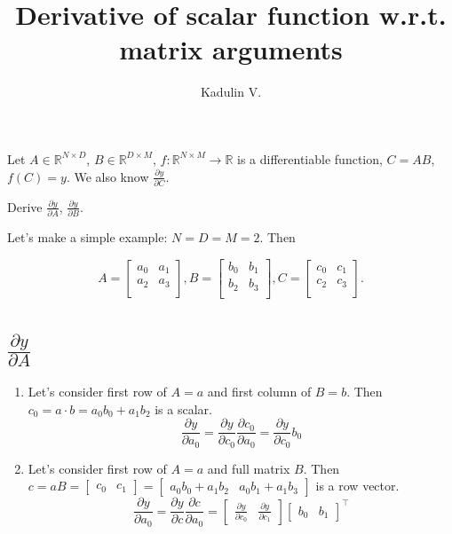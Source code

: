 \documentclass[12pt]{article}
\begin{document}
\title{Derivative of scalar function w.r.t. matrix arguments}
\author{Kadulin V.}
\maketitle

Let $A \in \mathbb{R}^{N \times D}$, $B \in \mathbb{R}^{D \times M}$, 
$f: \mathbb{R}^{N \times M} \rightarrow \mathbb{R}$ is a differentiable function, $C = AB$, $f(C) = y$. We also know $\frac{\partial y}{\partial C}$. 

Derive $\frac{\partial y}{\partial A}$, $\frac{\partial y}{\partial B}$.

Let's make a simple example: $N = D = M = 2$. Then

\[
	A = 
	\begin{bmatrix} 
		a_0 & a_1 \\
		a_2 & a_3 \\
	\end{bmatrix},
	B = 
	\begin{bmatrix} 
		b_0 & b_1 \\
		b_2 & b_3 \\
	\end{bmatrix},
	C = 
	\begin{bmatrix} 
		c_0 & c_1 \\
		c_2 & c_3 \\
	\end{bmatrix}.
\]

\section{$\frac{\partial y}{\partial A}$}

\begin{enumerate}
\item Let's consider first row of $A = a$ and first column of $B = b$.  
Then $c_0 = a \cdot b = a_0b_0 + a_1b_2$ is a scalar.  
\[
	\frac{\partial y}{\partial a_0} = 
	\frac{\partial y}{\partial c_0} \frac{\partial c_0}{\partial a_0} = 
	\frac{\partial y}{\partial c_0} b_0
\]
\item Let's consider first row of $A = a$ and full matrix $B$.  
Then $
c = aB = 
\begin{bmatrix}c_0 & c_1\end{bmatrix} =
\begin{bmatrix}a_0b_0 + a_1b_2 & a_0b_1 + a_1b_3\end{bmatrix} 
$ is a row vector.  
\[
	\frac{\partial y}{\partial a_0} = 
	\frac{\partial y}{\partial c} \frac{\partial c}{\partial a_0} = 
	\begin{bmatrix}
		\frac{\partial y}{\partial c_0} & \frac{\partial y}{\partial c_1}
	\end{bmatrix} 
	\begin{bmatrix} 
		b_0 & b_1
	\end{bmatrix} ^\top
\]
\end{enumerate}
\end{document}
